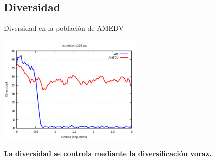 	\subsection*{Diversidad}

		\begin{frame}{Diversidad en la población de AMEDV}
			
			\fontsize{9}{10}\selectfont
			
			\centering \includegraphics[width=7cm]{./Images/Diversity/AMEDV/png/ts225.png}
							
			\kern 4mm
			\fontsize{9}{10}\selectfont
			
			\begin{tcolorbox}[colback=blue!5,colframe=blue!30]
				\centering
				\textbf{La diversidad se controla mediante la diversificación voraz.}
			\end{tcolorbox}
			
		\end{frame}